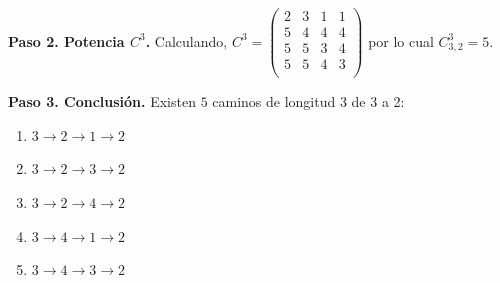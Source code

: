\begin{prob}
\begin{enumerate}[a)]
\begin{myproof}
\textbf{Paso 2. Potencia $C^3$.} Calculando, \(C^3 = \begin{pmatrix}
2 & 3 & 1 & 1 \\
5 & 4 & 4 & 4 \\
5 & 5 & 3 & 4 \\
5 & 5 & 4 & 3 \\
\end{pmatrix}\) por lo cual $C^3_{3,2} = 5.$

\textbf{Paso 3. Conclusión.} Existen $\boxed{5}$ caminos de longitud 3 de 3 a 2:
\begin{enumerate}[1.]
\item $3 \to 2 \to 1 \to 2$
\item $3 \to 2 \to 3 \to 2$
\item $3 \to 2 \to 4 \to 2$
\item $3 \to 4 \to 1 \to 2$
\item $3 \to 4 \to 3 \to 2$
\end{enumerate}
\end{myproof}
\end{enumerate}
\end{prob}

